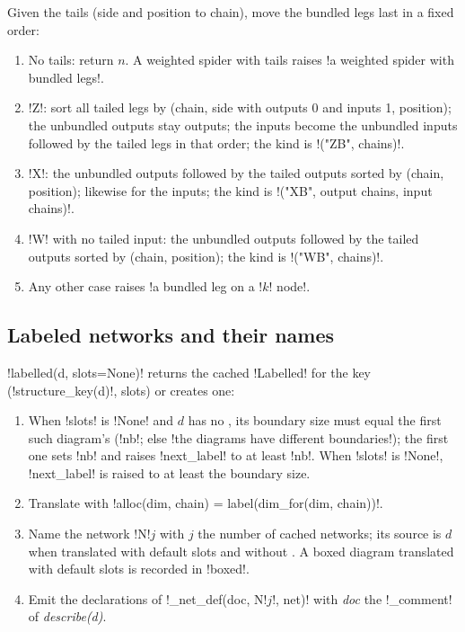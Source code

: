 {\begin{algorithm}\label{alg:lean-export-net-bundle-node}
Given the tails (side and position to chain), move the bundled legs last in a fixed order:
\begin{enumerate}
\item No tails: return $n$. A weighted spider with tails raises
  \code!a weighted spider with bundled legs!.
\item \code!Z!: sort all tailed legs by (chain, side with outputs 0 and inputs 1, position);
  the unbundled outputs stay outputs; the inputs become the unbundled inputs followed by the
  tailed legs in that order; the kind is \code!("ZB", chains)!.
\item \code!X!: the unbundled outputs followed by the tailed outputs sorted by (chain, position);
  likewise for the inputs; the kind is \code!("XB", output chains, input chains)!.
\item \code!W! with no tailed input: the unbundled outputs followed by the tailed outputs sorted
  by (chain, position); the kind is \code!("WB", chains)!.
\item Any other case raises \code!a bundled leg on a !$k$\code! node!.
\end{enumerate}
\end{algorithm}

\subsection{Labeled networks and their names}\label{sec:lean-export-net-labelled}

\py!labelled(d, slots=None)! returns the cached \py!Labelled! for the key
(\py!structure_key(d)!, slots) or creates one:

\begin{enumerate}
\item When \py!slots! is \py!None! and $d$ has no \bboxes{}, its boundary size must equal the
  first such diagram's (\py!nb!; else \code!the diagrams have different boundaries!); the first
  one sets \py!nb! and raises \py!next_label! to at least \py!nb!. When \py!slots! is \py!None!,
  \py!next_label! is raised to at least the boundary size.
\item Translate with \py!alloc(dim, chain) = label(dim_for(dim, chain))!.
\item Name the network \code!N!$j$ with $j$ the number of cached networks; its source is $d$ when
  translated with default slots and without \bboxes{}. A boxed diagram translated with default
  slots is recorded in \py!boxed!.
\item Emit the declarations of \py!_net_def(doc, N!$j$\py!, net)! with \textit{doc} the
  \py!_comment! of \textit{describe(d)}.
\end{enumerate}

}
